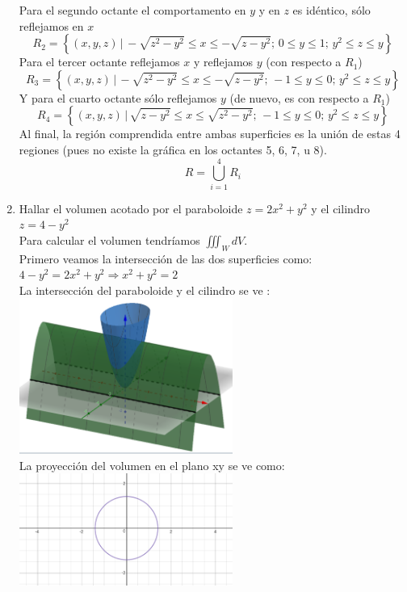 \documentclass{article}
\begin{document}
\begin{enumerate}
{        Para el segundo octante el comportamento en $y$ y en $z$ es idéntico, sólo reflejamos en $x$
        \[
            R_2=\left\{
                    (x,y,z)\,\big\vert\,
                    -\sqrt{z^2-y^2}\leq x\leq-\sqrt{z-y^2};\,
                    0\leq y\leq 1;\,
                    y^2\leq z\leq y
                \right\}
        \]
        Para el tercer octante reflejamos $x$ y reflejamos $y$ (con respecto a $R_1$)
        \[
            R_3=\left\{
                    (x,y,z)\,\big\vert\,
                    -\sqrt{z^2-y^2}\leq x\leq-\sqrt{z-y^2};\,
                    -1\leq y\leq 0;\,
                    y^2\leq z\leq y
                \right\}
        \]
        Y para el cuarto octante sólo reflejamos $y$ (de nuevo, es con respecto a $R_1$)
        \[
            R_4=\left\{
                    (x,y,z)\,\big\vert\,
                    \sqrt{z-y^2}\leq x\leq\sqrt{z^2-y^2};\,
                    -1\leq y\leq 0;\,
                    y^2\leq z\leq y
                \right\}
        \]
        Al final, la región comprendida entre ambas superficies es la unión de estas 4 regiones (pues no existe la gráfica en los octantes 5, 6, 7, u 8).
        \[
            R=\bigcup_{i=1}^4{R_i}
        \]
    }

   \item {
   Hallar el volumen acotado por el paraboloide $z = 2x^2 + y^2$ y el cilindro $z = 4 - y^2$\\

		Para calcular el volumen tendríamos $\iiint_W dV$.\\
		
		Primero veamos la intersección de las dos superficies como: $4-y^2 = 2x^2 + y^2 \Rightarrow x^2+y^2 = 2$\\

		La intersección del paraboloide y el cilindro se ve :
		\includegraphics[width=7cm]{ejercicio7.png}\\
		
		La proyección del volumen en el plano xy se ve como:
		\includegraphics[width=7cm]{ejercicio71.png}\\
		
}
\end{enumerate}
\end{document}
